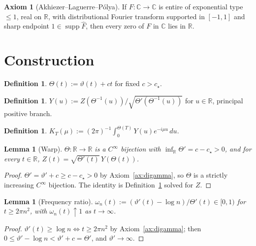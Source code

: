 \documentclass[11pt]{article}
\newtheorem{lemma}[theorem]{Lemma}
\theoremstyle{definition}
\newtheorem{definition}[theorem]{Definition}
\newtheorem{axiom}[theorem]{Axiom}
\newcommand{\R}{\mathbb{R}}
\newcommand{\C}{\mathbb{C}}
\newcommand{\supp}{\operatorname{supp}}
\begin{document}
\begin{axiom}[Akhiezer--Laguerre--P\'olya]\label{ax:ALP}
If \(F:\C\to\C\) is entire of exponential type \(\le 1\), real on \(\R\), with distributional Fourier transform supported in \([-1,1]\) and sharp endpoint \(1\in\supp\hat F\), then every zero of \(F\) in \(\C\) lies in \(\R\).
\end{axiom}

\section{Construction}

\begin{definition}\label{def:Theta}
\(\Theta(t):=\vartheta(t)+ct\) for fixed \(c>c_\star\).
\end{definition}

\begin{definition}\label{def:Y}
\(Y(u):=Z(\Theta^{-1}(u))/\sqrt{\Theta'(\Theta^{-1}(u))}\) for \(u\in\R\), principal positive branch.
\end{definition}

\begin{definition}\label{def:K}
\(K_T(\mu):=(2\pi)^{-1}\int_0^{\Theta(T)}Y(u)e^{-i\mu u}\,du\).
\end{definition}

\begin{lemma}[Warp]\label{lem:warp}
\(\Theta:\R\to\R\) is a \(C^\infty\) bijection with \(\inf_\R\Theta'=c-c_\star>0\), and for every \(t\in\R\), \(Z(t)=\sqrt{\Theta'(t)}\,Y(\Theta(t))\).
\end{lemma}

\begin{proof}
\(\Theta'=\vartheta'+c\ge c-c_\star>0\) by Axiom~\ref{ax:digamma}, so \(\Theta\) is a strictly increasing \(C^\infty\) bijection. The identity is Definition~\ref{def:Y} solved for \(Z\).
\end{proof}

\begin{lemma}[Frequency ratio]\label{lem:freq}
\(\omega_n(t):=(\vartheta'(t)-\log n)/\Theta'(t)\in[0,1)\) for \(t\ge 2\pi n^2\), with \(\omega_n(t)\uparrow 1\) as \(t\to\infty\).
\end{lemma}

\begin{proof}
\(\vartheta'(t)\ge\log n\iff t\ge 2\pi n^2\) by Axiom~\ref{ax:digamma}; then \(0\le\vartheta'-\log n<\vartheta'+c=\Theta'\), and \(\vartheta'\to\infty\).
\end{proof}
\end{document}
